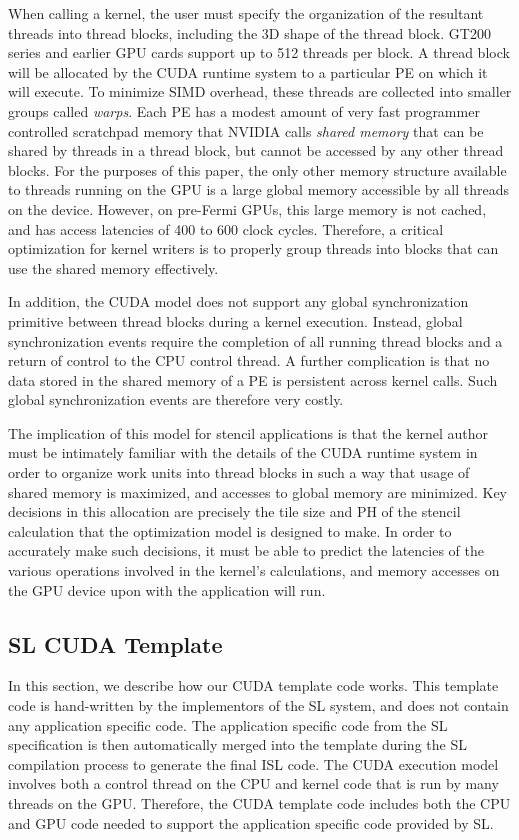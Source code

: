 \documentclass[preprint,nocopyrightspace]{styles/sigplanconf}
\begin{document}
When calling a kernel, the user must specify the organization of the resultant
threads into thread blocks, including the 3D shape of the thread
block.  GT200 series and earlier GPU cards support up to 512 threads per block.
A thread block will be allocated by the CUDA runtime system to a particular PE
on which it will execute.  To minimize SIMD overhead, these threads are
collected into smaller groups called {\em warps}.  Each PE has a modest amount
of very fast programmer controlled scratchpad memory that NVIDIA calls {\em
shared memory} that can be shared by threads in a thread block, but  cannot be
accessed by any other thread blocks.  For the purposes of this paper, the only
other memory structure available to threads running on the GPU is a large
global memory accessible by all threads on the device.  However, on pre-Fermi
GPUs, this large memory is not cached, and has access latencies of 400
to 600 clock cycles.  Therefore, a critical optimization for kernel
writers is to properly group threads into blocks that can use the shared memory
effectively.

In addition, the CUDA model does not support any global synchronization primitive
between thread blocks during a kernel execution.  Instead, global synchronization
events require the completion of all running thread blocks and a return of control to 
the CPU control thread.  A further complication is that no data stored in the 
shared memory of a PE is persistent across kernel calls.
Such global synchronization events are therefore very costly.

The implication of this model for stencil applications is that the kernel
author must be intimately familiar with the details of the CUDA runtime
system in order to organize work units into thread blocks in such a way
that usage of shared memory is maximized, and accesses to global memory
are minimized.  Key decisions in this allocation are precisely the
tile size and PH of the stencil calculation that the optimization
model is designed to make.  In order to accurately make such decisions, it must
be able to predict the latencies of the various operations involved in the kernel's
calculations, and memory accesses on the GPU device upon with the application will run.

\subsection{SL CUDA Template}

In this section, we describe how our CUDA template code works.  
This template code is hand-written by the implementors of the SL 
system, and does not contain any application specific code.  
The application specific code from the SL specification is then
automatically merged into the template during the SL compilation
process to generate the final ISL code.  The CUDA execution
model involves both a control thread on the CPU and kernel code
that is run by many threads on the GPU.
Therefore, the CUDA template code includes both the CPU and GPU
code needed to support the application specific code provided by SL.
\end{document}
